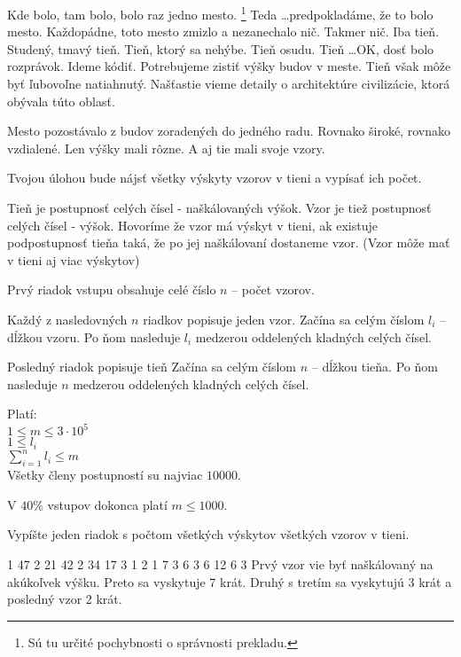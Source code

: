 





Kde bolo, tam bolo, bolo raz jedno mesto.
\footnote{Sú tu určité pochybnosti o správnosti prekladu.}
Teda \dots predpokladáme, že to bolo mesto.
Každopádne, toto mesto zmizlo a nezanechalo nič.
Takmer nič. Iba tieň. Studený, tmavý tieň.
Tieň, ktorý sa nehýbe. Tieň osudu.
Tieň \dots OK, dosť bolo rozprávok.
Ideme kódiť.
Potrebujeme zistiť výšky budov v meste.
Tieň však môže byť ľubovoľne natiahnutý.
Našťastie vieme detaily o architektúre civilizácie,
ktorá obývala túto oblasť.

Mesto pozostávalo z budov zoradených do jedného radu.
Rovnako široké, rovnako vzdialené. Len výšky mali rôzne.
A aj tie mali svoje vzory.

Tvojou úlohou bude nájsť všetky výskyty vzorov v tieni
a vypísať ich počet.



Tieň je postupnosť celých čísel - naškálovaných výšok.
Vzor je tiež postupnosť celých čísel - výšok.
Hovoríme že vzor má výskyt v tieni,
ak existuje podpostupnosť tieňa taká,
že po jej naškálovaní dostaneme vzor.
(Vzor môže mať v tieni aj viac výskytov)



Prvý riadok vstupu obsahuje celé číslo $n$
-- počet vzorov.

Každý z nasledovných $n$ riadkov popisuje jeden vzor.
Začína sa celým číslom $l_i$ -- dĺžkou vzoru.
Po ňom nasleduje $l_i$ medzerou oddelených kladných celých čísel.

Posledný riadok popisuje tieň
Začína sa celým číslom $n$ -- dĺžkou tieňa.
Po ňom nasleduje $n$ medzerou oddelených kladných celých čísel.

\bigskip

Platí:\\
$1 \leq m \leq 3\cdot10^5$\\
$1 \leq l_i$\\
$\sum^{n}_{i=1} l_i \leq m$\\
Všetky členy postupností su najviac $10000$.

\smallskip

V $40\%$ vstupov dokonca platí $m \leq 1000$.


Vypíšte jeden riadok s počtom všetkých výskytov
všetkých vzorov v tieni.



1 47
2 21 42
2 34 17
3 1 2 1
7 3 6 3 6 12 6 3
\sampleCOMMENT
Prvý vzor vie byť naškálovaný na akúkoľvek výšku.
Preto sa vyskytuje 7 krát. Druhý s tretím sa
vyskytujú 3 krát a posledný vzor 2 krát.
\sampleEND


